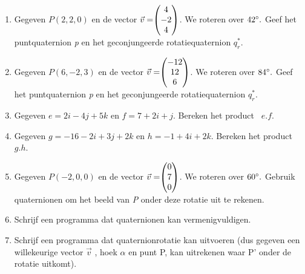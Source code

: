 \begin{enumerate}
	\item Gegeven $ P (2,2,0) $ en de vector $\vec{v} = \vecdrie{4}{-2}{4} $. 
	We roteren over $ 42\degree. $ Geef het puntquaternion \textit{p} en het geconjungeerde rotatiequaternion  $  q_r^* $. 
	
	\item Gegeven $ P (6,-2,3) $ en de vector $\vec{v} = \vecdrie{-12}{12}{6} $. 
	We roteren over $ 84\degree. $ Geef het puntquaternion \textit{p} en het geconjungeerde rotatiequaternion  $  q_r^* $. 
	
	\item Gegeven $ e = 2i-4j+5k$ en   $ f = 7+2i+j $. 
	Bereken het product \ $  e.f $.
	
	\item Gegeven $ g = -16 -2i+3j+2k $ en   $ h = -1+4i+2k $. 
	Bereken het product \ $  g.h $.
	
	\item  Gegeven $ P (-2, 0, 0) $ en de vector $\vec{v} = \vecdrie{0}{7}{0} $. 
	We roteren over $ 60\degree. $ Gebruik quaternionen om het beeld van \textit{P }onder deze rotatie uit te rekenen.   
	
	\item Schrijf een programma dat quaternionen kan vermenigvuldigen.   
	
	\item Schrijf een programma dat quaternionrotatie kan uitvoeren (dus gegeven een willekeurige vector $\vec{v} $ , hoek $ \alpha $ en punt P, kan uitrekenen waar P' onder de rotatie uitkomt).      
	
\end{enumerate}


